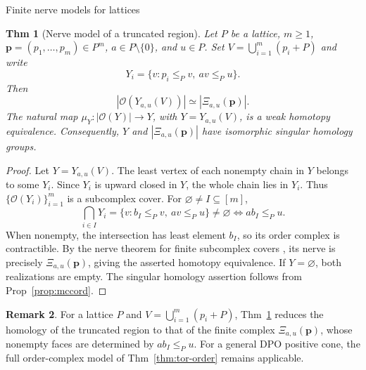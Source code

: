 \documentclass[10pt,letterpaper]{amsart}
\makeatletter
\numberwithin{equation}{section}
\newtheorem{thm}{Thm}[section]
\theoremstyle{definition}
\newtheorem{rem}[thm]{Remark}
\newcommand{\ord}{\mathcal O}
\def\subsection{\@startsection{subsection}{2}
  \z@{.9\linespacing\@plus.3\linespacing}{.4\linespacing}
  {\normalfont\fontsize{11.5}{14}\selectfont\bfseries\boldmath\raggedright}}
\makeatother
\begin{document}
\subsection{Finite nerve models for lattices}
\begin{thm}[Nerve model of a truncated region]\label{thm:nerve}
Let $P$ be a lattice, $m\ge1$, $\mathbf p=(p_1,\ldots,p_m)\in P^m$, $a\in P\setminus\{0\}$, and $u\in P$. Set $V=\bigcup_{i=1}^m(p_i+P)$ and write
\[
Y_i=\{v:p_i\le_Pv,\ av\le_Pu\}.
\]
Then
\[
|\ord(Y_{a,u}(V))|\simeq|\Xi_{a,u}(\mathbf p)|.
\]
The natural map $\mu_Y:|\ord(Y)|\to Y$, with $Y=Y_{a,u}(V)$, is a weak homotopy equivalence. Consequently, $Y$ and $|\Xi_{a,u}(\mathbf p)|$ have isomorphic singular homology groups.
\end{thm}
\begin{proof}
Let $Y=Y_{a,u}(V)$. The least vertex of each nonempty chain in $Y$ belongs to some $Y_i$. Since $Y_i$ is upward closed in $Y$, the whole chain lies in $Y_i$. Thus $\{\ord(Y_i)\}_{i=1}^m$ is a subcomplex cover.
For $\varnothing\ne I\subseteq[m]$,
\[
\bigcap_{i\in I}Y_i=\{v:b_I\le_Pv,\ av\le_Pu\}\ne\varnothing
\iff ab_I\le_Pu.
\]
When nonempty, the intersection has least element $b_I$, so its order complex is contractible. By the nerve theorem for finite subcomplex covers \cite[Theorem 10.6]{Bjorner}, its nerve is precisely $\Xi_{a,u}(\mathbf p)$, giving the asserted homotopy equivalence. If $Y=\varnothing$, both realizations are empty. The singular homology assertion follows from Prop~\ref{prop:mccord}.
\end{proof}

\begin{rem}\label{rem:finite-model}
For a lattice $P$ and $V=\bigcup_{i=1}^m(p_i+P)$, Thm~\ref{thm:nerve} reduces the homology of the truncated region to that of the finite complex $\Xi_{a,u}(\mathbf p)$, whose nonempty faces are determined by $ab_I\le_Pu$. For a general DPO positive cone, the full order-complex model of Thm~\ref{thm:tor-order} remains applicable.
\end{rem}
\end{document}
